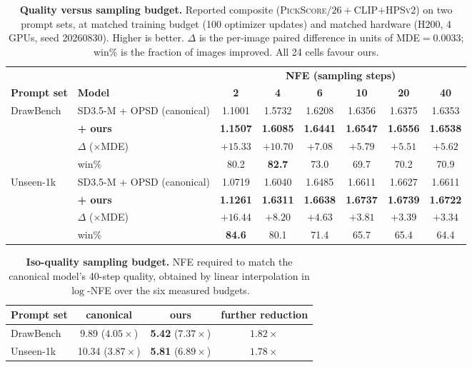\begin{table}[t]
\centering
\setlength{\tabcolsep}{4pt}
\caption{\textbf{Quality versus sampling budget.} Reported composite
(\textsc{PickScore}$/26+$\textsc{CLIP}$+$\textsc{HPSv2}) on two prompt sets, at matched
training budget (100 optimizer updates) and matched hardware (H200, 4 GPUs, seed 20260830).
Higher is better. $\Delta$ is the per-image paired difference in units of MDE$=0.0033$;
win\% is the fraction of images improved. All 24 cells favour ours.}
\label{tab:main}
\begin{tabular}{llcccccc}
\toprule
& & \multicolumn{6}{c}{\textbf{NFE (sampling steps)}} \\
\cmidrule(lr){3-8}
\textbf{Prompt set} & \textbf{Model} & \textbf{2} & \textbf{4} & \textbf{6} & \textbf{10} & \textbf{20} & \textbf{40} \\
\midrule
\multirow{4}{*}{DrawBench}
 & SD3.5-M + OPSD (canonical)      & 1.1001 & 1.5732 & 1.6208 & 1.6356 & 1.6375 & 1.6353 \\
 & \textbf{+ ours}                 & \textbf{1.1507} & \textbf{1.6085} & \textbf{1.6441} & \textbf{1.6547} & \textbf{1.6556} & \textbf{1.6538} \\
 & \quad $\Delta$ ($\times$MDE)    & $+15.33$ & $+10.70$ & $+7.08$ & $+5.79$ & $+5.51$ & $+5.62$ \\
 & \quad win\%                     & 80.2 & \textbf{82.7} & 73.0 & 69.7 & 70.2 & 70.9 \\
\midrule
\multirow{4}{*}{Unseen-1k}
 & SD3.5-M + OPSD (canonical)      & 1.0719 & 1.6040 & 1.6485 & 1.6611 & 1.6627 & 1.6611 \\
 & \textbf{+ ours}                 & \textbf{1.1261} & \textbf{1.6311} & \textbf{1.6638} & \textbf{1.6737} & \textbf{1.6739} & \textbf{1.6722} \\
 & \quad $\Delta$ ($\times$MDE)    & $+16.44$ & $+8.20$ & $+4.63$ & $+3.81$ & $+3.39$ & $+3.34$ \\
 & \quad win\%                     & \textbf{84.6} & 80.1 & 71.4 & 65.7 & 65.4 & 64.4 \\
\bottomrule
\end{tabular}
\end{table}

\begin{table}[t]
\centering
\caption{\textbf{Iso-quality sampling budget.} NFE required to match the canonical model's
40-step quality, obtained by linear interpolation in $\log$-NFE over the six measured budgets.}
\label{tab:iso}
\begin{tabular}{lccc}
\toprule
\textbf{Prompt set} & \textbf{canonical} & \textbf{ours} & \textbf{further reduction} \\
\midrule
DrawBench & 9.89 \; ($4.05\times$) & \textbf{5.42} \; ($\mathbf{7.37\times}$) & $\mathbf{1.82\times}$ \\
Unseen-1k & 10.34 \; ($3.87\times$) & \textbf{5.81} \; ($\mathbf{6.89\times}$) & $\mathbf{1.78\times}$ \\
\bottomrule
\end{tabular}
\end{table}

